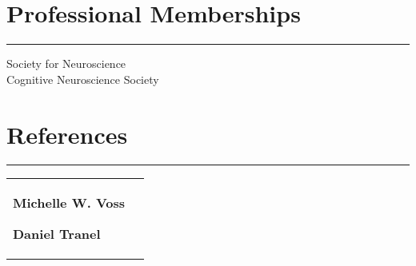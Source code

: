 \documentclass[11pt,letterpaper,sans]{moderncv}
\makeatletter
\newcommand{\cvdoublecolumn}[2]{%
  \cvitem{}{%
    \begin{minipage}[t]{1.3\listdoubleitemcolumnwidth}#1\end{minipage}%
    \hfill%
    \begin{minipage}[t]{1.3\listdoubleitemcolumnwidth}#2\end{minipage}%
    }%
}
\newcommand{\cvreference}[7]{%
    \textbf{#1}\newline%
    \ifthenelse{\equal{#2}{}}{}{\addresssymbol~#2\newline}%
    \ifthenelse{\equal{#3}{}}{}{#3\newline}%
    \ifthenelse{\equal{#4}{}}{}{#4\newline}%
    \ifthenelse{\equal{#5}{}}{}{#5\newline}%
    \ifthenelse{\equal{#6}{}}{}{\emailsymbol~\texttt{\href{mailto:#6}{\nolinkurl{#6}}}\newline}%
    \ifthenelse{\equal{#7}{}}{}{\phonesymbol~#7}}
\renewcommand*{\cvitem}[3][.25em]{%
  \begin{tabular}{@{}p{\maincolumnwidth}@{\hspace{\separatorcolumnwidth}}p{\hintscolumnwidth}@{}}%
    {#3} &\raggedleft\hintstyle{#2}%
  \end{tabular}%
  \par\addvspace{#1}}
\makeatother
\begin{document}
\bigskip{}
\section{Professional Memberships} \smallskip \hrule \medskip
\noindent Society for Neuroscience\\
\noindent Cognitive Neuroscience Society\\

\clearpage
\bigskip{}
\section{References} \smallskip \hrule \medskip

\cvdoublecolumn{\cvreference{Michelle W. Voss}
    {Department of Psychological and Brain Sciences}
    {The University of Iowa}
    {Iowa City, IA 52242}
    {}
    {michelle-voss@uiowa.edu}
    {+1 (319) 335-2057}%
    }
    {\cvreference{Daniel Tranel}
        {Department of Psychological and Brain Sciences}
        {Department of Neurology}
        {The University of Iowa}
        {Iowa City, IA 52242}
        {daniel-tranel@uiowa.edu}
        {+1 (319) 384-6050}%
    }
\end{document}
